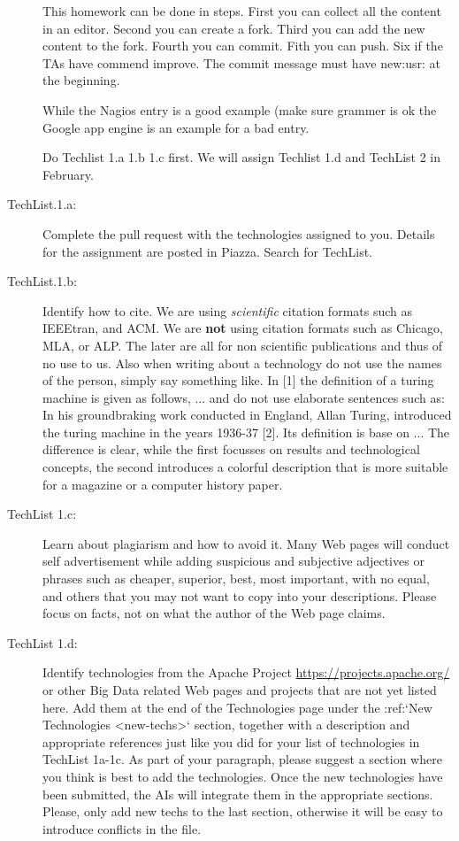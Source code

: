 \begin{description}
  This homework can be done in steps. First you can collect all the
  content in an editor. Second you can create a fork. Third you can
  add the new content to the fork. Fourth you can commit. Fith you
  can push. Six if the TAs have commend improve. The commit message
  must have new:usr: at the beginning.

  While the Nagios entry is a good example (make sure grammer is ok
  the Google app engine is an example for a bad entry.

  Do Techlist 1.a 1.b 1.c first. We  will assign Techlist 1.d and
  TechList 2 in February.

\item[TechList.1.a:]  Complete the pull request with the technologies assigned to you.
  Details for the assignment are posted in Piazza. Search for TechList.

\item[TechList.1.b:] Identify how to cite. We are using {\em scientific} citation
  formats such as IEEEtran, and ACM. We are {\bf not} using citation
  formats such as Chicago, MLA, or ALP. The later are all for non
  scientific publications and thus of no use to us. Also when writing
  about a technology do not use the names of the person, simply say
  something like. In [1] the definition of a turing machine is given
  as follows, ...  and do not use elaborate sentences such as: In his
  groundbraking work conducted in England, Allan Turing, introduced
  the turing machine in the years 1936-37 [2]. Its definition is base
  on ... The difference is clear, while the first focusses on results
  and technological concepts, the second introduces a colorful
  description that is more suitable for a magazine or a computer
  history paper.

\item[TechList 1.c:]
  Learn about plagiarism and how to avoid it.
  Many Web pages will conduct self advertisement while adding
  suspicious and subjective adjectives or phrases such as cheaper,
  superior, best, most important, with no equal, and others that you
  may not want to copy into your descriptions. Please focus on facts,
  not on what the author of the Web page claims.

\item[TechList 1.d:]
  Identify technologies from the Apache Project
  \url{https://projects.apache.org/} or other Big Data related Web pages
  and projects that are not yet listed here. Add them at the end of
  the Technologies page under the :ref:`New Technologies <new-techs>`
  section, together with a description and appropriate references just
  like you did for your list of technologies in TechList 1a-1c. As
  part of your paragraph, please suggest a section where you think is
  best to add the technologies. Once the new technologies have been
  submitted, the AIs will integrate them in the appropriate
  sections. Please, only add new techs to the last section, otherwise
  it will be easy to introduce conflicts in the file.


\end{description}
